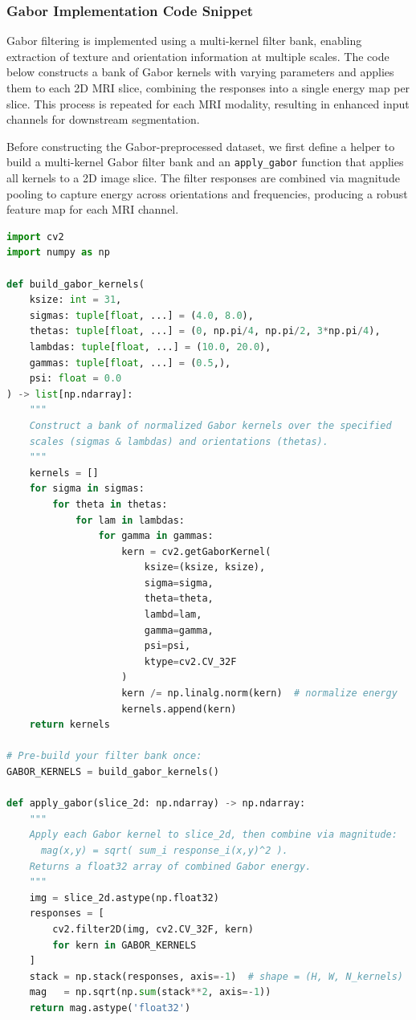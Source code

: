 \subsubsection{Gabor Implementation Code Snippet}
\label{sec:gabor_impl_code}

Gabor filtering is implemented using a multi-kernel filter bank, enabling extraction of texture and orientation information at multiple scales. The code below constructs a bank of Gabor kernels with varying parameters and applies them to each 2D MRI slice, combining the responses into a single energy map per slice. This process is repeated for each MRI modality, resulting in enhanced input channels for downstream segmentation.

Before constructing the Gabor-preprocessed dataset, we first define a helper to build a multi-kernel Gabor filter bank and an \texttt{apply\_gabor} function that applies all kernels to a 2D image slice. The filter responses are combined via magnitude pooling to capture energy across orientations and frequencies, producing a robust feature map for each MRI channel.


\begin{lstlisting}[language=Python]
import cv2
import numpy as np

def build_gabor_kernels(
    ksize: int = 31,
    sigmas: tuple[float, ...] = (4.0, 8.0),
    thetas: tuple[float, ...] = (0, np.pi/4, np.pi/2, 3*np.pi/4),
    lambdas: tuple[float, ...] = (10.0, 20.0),
    gammas: tuple[float, ...] = (0.5,),
    psi: float = 0.0
) -> list[np.ndarray]:
    """
    Construct a bank of normalized Gabor kernels over the specified
    scales (sigmas & lambdas) and orientations (thetas).
    """
    kernels = []
    for sigma in sigmas:
        for theta in thetas:
            for lam in lambdas:
                for gamma in gammas:
                    kern = cv2.getGaborKernel(
                        ksize=(ksize, ksize),
                        sigma=sigma,
                        theta=theta,
                        lambd=lam,
                        gamma=gamma,
                        psi=psi,
                        ktype=cv2.CV_32F
                    )
                    kern /= np.linalg.norm(kern)  # normalize energy
                    kernels.append(kern)
    return kernels

# Pre-build your filter bank once:
GABOR_KERNELS = build_gabor_kernels()

def apply_gabor(slice_2d: np.ndarray) -> np.ndarray:
    """
    Apply each Gabor kernel to slice_2d, then combine via magnitude:
      mag(x,y) = sqrt( sum_i response_i(x,y)^2 ).
    Returns a float32 array of combined Gabor energy.
    """
    img = slice_2d.astype(np.float32)
    responses = [
        cv2.filter2D(img, cv2.CV_32F, kern)
        for kern in GABOR_KERNELS
    ]
    stack = np.stack(responses, axis=-1)  # shape = (H, W, N_kernels)
    mag   = np.sqrt(np.sum(stack**2, axis=-1))
    return mag.astype('float32')
\end{lstlisting}


